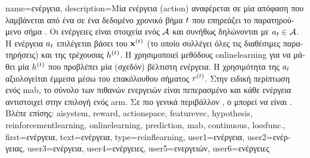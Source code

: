 {name={\foreignlanguage{greek}{ενέργεια}},
	description={\foreignlanguage{greek}{Μία ενέργεια} (action) 
		\foreignlanguage{greek}{αναφέρεται σε μία απόφαση που λαμβάνεται από ένα} 
		\foreignlanguage{greek}{σε ένα δεδομένο χρονικό βήμα $t$ που επηρεάζει το παρατηρούμενο σήμα}  
		. \foreignlanguage{greek}{Οι ενέργειες είναι στοιχεία ενός} 
		 $\mathcal{A}$ \foreignlanguage{greek}{και συνήθως δηλώνονται με 
		$a_{t} \in \mathcal{A}$. Η ενέργεια $a_{t}$ επιλέγεται βάσει του}
		 ${\bf x}^{(t)}$ \foreignlanguage{greek}{(το οποίο συλλέγει όλες τις  
		διαθέσιμες παρατηρήσεις) και της τρέχουσας}  $h^{(t)}$. 
		\foreignlanguage{greek}{Η}  \foreignlanguage{greek}{χρησιμοποιεί 
		μεθόδους} \gls{onlinelearning} \foreignlanguage{greek}{για να μάθει μία}  
		$h^{(t)}$ \foreignlanguage{greek}{που προβλέπει μία (σχεδόν) βέλτιστη ενέργεια. 
		Η χρησιμότητα της}  $a_{t}$ \foreignlanguage{greek}{αξιολογείται 
		έμμεσα μέσω του επακόλουθου σήματος}  $r^{(t)}$.
		\foreignlanguage{greek}{Στην ειδική περίπτωση ενός} \gls{mab}, \foreignlanguage{greek}{το σύνολο 
		των πιθανών ενεργειών είναι πεπερασμένο και κάθε ενέργεια αντιστοιχεί στην επιλογή ενός} arm. 
		\foreignlanguage{greek}{Σε πιο γενικά περιβάλλον} , 
		\foreignlanguage{greek}{ο}  \foreignlanguage{greek}{μπορεί να είναι} .
		\\
		\foreignlanguage{greek}{Βλέπε επίσης:} \gls{aisystem}, \gls{reward}, \gls{actionspace}, \gls{featurevec}, 
		\gls{hypothesis}, \gls{reinforcementlearning}, \gls{onlinelearning}, \gls{prediction}, \gls{mab}, \gls{continuous}, \gls{lossfunc}.},
	first={\foreignlanguage{greek}{ενέργεια}},
	text={\foreignlanguage{greek}{ενέργεια}},
	type=reinflearning,
	user1={\foreignlanguage{greek}{ενέργεια}}, %
  	user2={\foreignlanguage{greek}{ενέργειας}}, %
	user3={\foreignlanguage{greek}{ενέργεια}}, %
	user4={\foreignlanguage{greek}{ενέργειες}}, %
  	user5={\foreignlanguage{greek}{ενεργειών}}, %
	user6={\foreignlanguage{greek}{ενέργειες}} %
}

